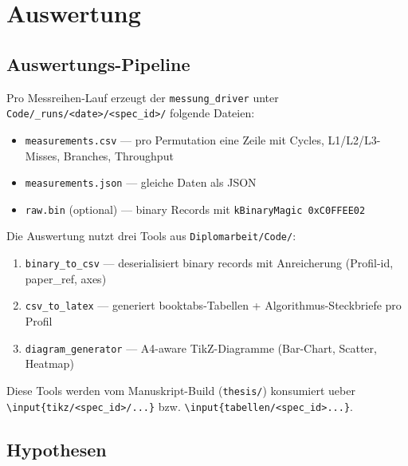 \chapter{Auswertung}\label{ch:auswertung}


\section{Auswertungs-Pipeline}

Pro Messreihen-Lauf erzeugt der \texttt{messung\_driver} unter
\texttt{Code/\_runs/<date>/<spec\_id>/} folgende Dateien:

\begin{itemize}
    \item \texttt{measurements.csv} --- pro Permutation eine Zeile mit
          Cycles, L1/L2/L3-Misses, Branches, Throughput
    \item \texttt{measurements.json} --- gleiche Daten als JSON
    \item \texttt{raw.bin} (optional) --- binary Records mit
          \texttt{kBinaryMagic 0xC0FFEE02}
\end{itemize}

Die Auswertung nutzt drei Tools aus \texttt{Diplomarbeit/Code/}:

\begin{enumerate}
    \item \texttt{binary\_to\_csv} --- deserialisiert binary records
          mit Anreicherung (Profil-id, paper\_ref, axes)
    \item \texttt{csv\_to\_latex} --- generiert booktabs-Tabellen +
          Algorithmus-Steckbriefe pro Profil
    \item \texttt{diagram\_generator} --- A4-aware TikZ-Diagramme
          (Bar-Chart, Scatter, Heatmap)
\end{enumerate}

Diese Tools werden vom Manuskript-Build (\texttt{thesis/}) konsumiert
ueber \texttt{\textbackslash input\{tikz/<spec\_id>/...\}} bzw.
\texttt{\textbackslash input\{tabellen/<spec\_id>...\}}.

\section{Hypothesen}

